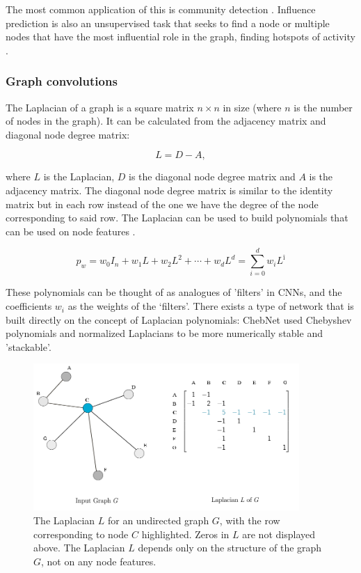 	The most common application of this is community detection \cite{bruna2017community}. Influence prediction is also an unsupervised task that seeks to find a node or multiple nodes that have the most influential role in the graph, finding hotspots of activity \cite{cao2020popularity}. 
	
	\subsubsection{Graph convolutions}
	
	The Laplacian of a graph is a square matrix $n \times n$ in size (where $n$ is the number of nodes in the graph). It can be calculated from the adjacency matrix and diagonal node degree matrix:
	
	$$ L = D - A, $$
	
	where $L$ is the Laplacian, $D$ is the diagonal node degree matrix and $A$ is the adjacency matrix. The diagonal node degree matrix is similar to the identity matrix but in each row instead of the one we have the degree of the node corresponding to said row. The Laplacian can be used to build polynomials that can be used on node features \cite{daigavane2021understanding}.
	
	$$ p_w = w_0 I_n + w_1 L + w_2 L^2 + \cdots + w_d L^d = \sum_{i=0}^{d} w_i L^î $$
	
	These polynomials can be thought of as analogues of 'filters' in CNNs, and the coefficients $w_i$ as the weights of the ‘filters’. There exists a type of network that is built directly on the concept of Laplacian polynomials: ChebNet \cite{defferrard2016convolutional} used Chebyshev polynomials and normalized Laplacians to be more numerically stable and 'stackable'.
	
	\begin{figure}[!h]
		\centering
		\includegraphics[width=0.9\textwidth]{figures/Laplacian.png}
		\caption{The Laplacian $L$ for an undirected graph $G$, with the row corresponding to node $C$ highlighted. Zeros in $L$ are not displayed above. The Laplacian $L$ depends only on the structure of the graph $G$, not on any node features. \cite{daigavane2021understanding}}
	\end{figure}
	
